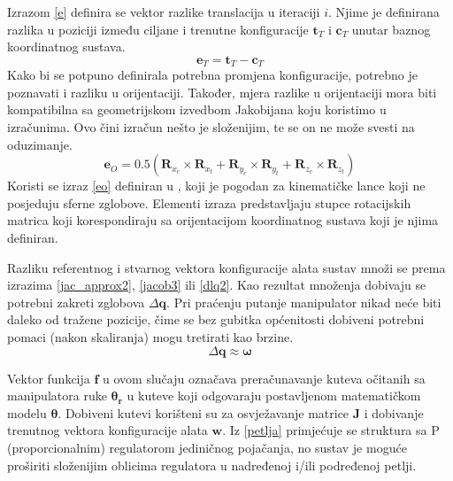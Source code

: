 \documentclass[times, utf8, diplomski, numeric]{fer}
\begin{document}
Izrazom \ref{e} definira se vektor razlike translacija u iteraciji $i$. Njime je definirana razlika u poziciji između ciljane i trenutne konfiguracije ${\mathbf{t}_{T}}$ i ${\mathbf{c}_{T}}$ unutar baznog koordinatnog sustava.
\begin{equation}
{\mathbf{e}_{T}} = {\mathbf{t}_{T}} -{\mathbf{c}_{T}}
\label{e}
\end{equation}
Kako bi se potpuno definirala potrebna promjena konfiguracije, potrebno je poznavati i razliku u orijentaciji.
Također, mjera razlike u orijentaciji mora biti kompatibilna sa geometrijskom izvedbom Jakobijana koju koristimo u izračunima.
Ovo čini izračun nešto je složenijim, te se on ne može svesti na oduzimanje.
\begin{equation}
{\mathbf{e}_{O}} = 0.5\left(\mathbf{R}_{x_c}\times\mathbf{R}_{x_t} + \mathbf{R}_{y_c}\times\mathbf{R}_{y_t} + \mathbf{R}_{z_c}\times\mathbf{R}_{z_t}\right)
\label{eo}
\end{equation}
Koristi se izraz \ref{eo} definiran u \cite{siciliano2010robotics}, koji je pogodan za kinematičke lance koji ne posjeduju sferne zglobove.
Elementi izraza predstavljaju stupce rotacijskih matrica koji korespondiraju sa orijentacijom koordinatnog sustava koji je njima definiran.

Razliku referentnog i stvarnog vektora konfiguracije alata sustav množi se prema izrazima \ref{jac_approx2}, \ref{jacob3} ili \ref{dlq2}.
Kao rezultat množenja dobivaju se potrebni zakreti zglobova $\Delta \mathbf{q}$.
Pri praćenju putanje manipulator nikad neće biti daleko od tražene pozicije, čime se bez gubitka općenitosti dobiveni potrebni pomaci (nakon skaliranja) mogu tretirati kao brzine.
\begin{equation}
\Delta \mathbf{q} \approx \bm{\omega}
\end{equation}

Vektor funkcija $\mathbf{f}$ u ovom slučaju označava preračunavanje kuteva očitanih sa manipulatora ruke $\bm{\theta_r}$ u kuteve koji odgovaraju postavljenom matematičkom modelu $\bm{\theta}$. 
Dobiveni kutevi korišteni su za osvježavanje matrice $\mathbf{J}$ i dobivanje trenutnog vektora konfiguracije alata $\mathbf{w}$. 
Iz \ref{petlja} primjećuje se struktura sa P (proporcionalnim) regulatorom jediničnog pojačanja, no sustav je moguće proširiti složenijim oblicima regulatora u nadređenoj i/ili podređenoj petlji.
\end{document}
